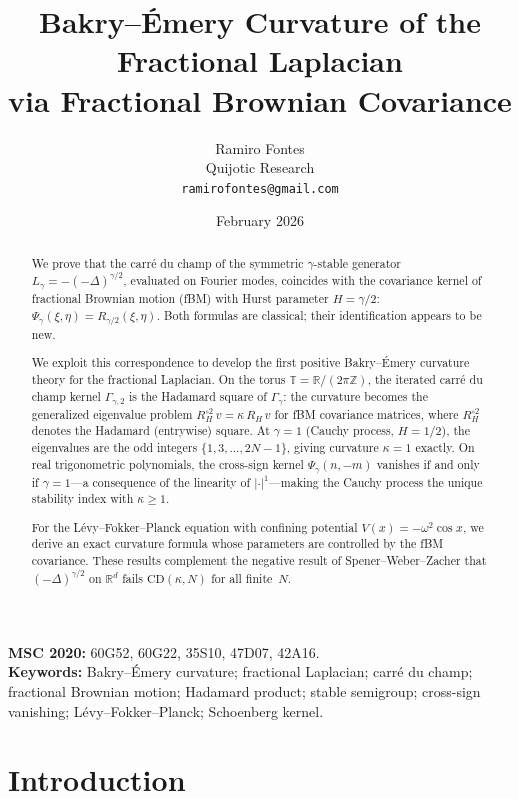 \documentclass[11pt,a4paper]{article}
\title{Bakry--\'Emery Curvature of the Fractional Laplacian\\
via Fractional Brownian Covariance}
\author{Ramiro Fontes\\
Quijotic Research\\
\texttt{ramirofontes@gmail.com}}
\date{February 2026}
\theoremstyle{plain}
\theoremstyle{definition}
\theoremstyle{remark}
\newcommand{\R}{\mathbb{R}}
\newcommand{\Z}{\mathbb{Z}}
\newcommand{\T}{\mathbb{T}}
\begin{document}
\maketitle

\begin{abstract}
We prove that the carr\'e du champ of the symmetric $\gamma$-stable
generator $L_\gamma = -(-\Delta)^{\gamma/2}$, evaluated on Fourier modes,
coincides with the covariance kernel of fractional Brownian motion (fBM)
with Hurst parameter $H = \gamma/2$:
$\Psi_\gamma(\xi,\eta) = R_{\gamma/2}(\xi,\eta)$.
Both formulas are classical; their identification appears to be new.

We exploit this correspondence to develop the first positive Bakry--\'Emery
curvature theory for the fractional Laplacian.
On the torus $\T = \R/(2\pi\Z)$, the iterated carr\'e du champ
kernel $\Gamma_{\gamma,2}$ is the Hadamard square of $\Gamma_\gamma$:
the curvature becomes the generalized eigenvalue problem
$R_H^{\circ 2}\,v = \kappa\,R_H\,v$ for fBM covariance matrices,
where $R_H^{\circ 2}$ denotes the Hadamard (entrywise) square.
At $\gamma = 1$ (Cauchy process, $H = 1/2$), the eigenvalues are the
odd integers $\{1,3,\ldots,2N{-}1\}$, giving curvature $\kappa = 1$
exactly.
On real trigonometric polynomials, the cross-sign kernel
$\Psi_\gamma(n,-m)$ vanishes if and only if $\gamma = 1$---a
consequence of the linearity of $|\cdot|^1$---making the Cauchy
process the unique stability index with $\kappa \geq 1$.

For the L\'evy--Fokker--Planck equation with confining potential
$V(x) = -\omega^2\cos x$, we derive an exact curvature formula
whose parameters are controlled by the fBM covariance.
These results complement the negative result of Spener--Weber--Zacher
that $(-\Delta)^{\gamma/2}$ on $\R^d$ fails
$\mathrm{CD}(\kappa,N)$ for all finite~$N$.
\end{abstract}

\medskip
\noindent\textbf{MSC 2020:} 60G52, 60G22, 35S10, 47D07, 42A16.\\
\textbf{Keywords:} Bakry--\'Emery curvature; fractional Laplacian;
carr\'e du champ; fractional Brownian motion; Hadamard product;
stable semigroup; cross-sign vanishing; L\'evy--Fokker--Planck;
Schoenberg kernel.


\section{Introduction}\label{sec:intro}
\end{document}
